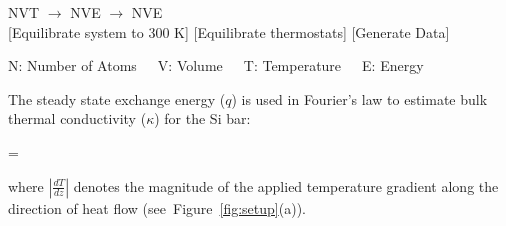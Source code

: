 \begin{center}

NVT \hspace{5mm} $\rightarrow$ \hspace{5mm} NVE \hspace{5mm}
$\rightarrow$ \hspace{5mm} NVE
\\ \vspace{1mm}
\tiny \hspace{-5mm}[Equilibrate system to 300 K] \hspace{1mm} [Equilibrate thermostats] \hspace{4mm}
 [Generate Data]
\\ \vspace{1mm}

\tiny{N: Number of Atoms~~~V: Volume~~~T: Temperature~~~E: Energy}
\end{center}

The steady state exchange energy ($q$) is used in Fourier's law to estimate bulk thermal conductivity ($\kappa$)
for the Si  bar:

\be
 \kappa =  
\ee

\noindent where $\left|\frac{dT}{dz}\right|$ denotes the magnitude of the applied temperature gradient along the 
direction of heat flow (see~Figure~\ref{fig:setup}(a)).





























